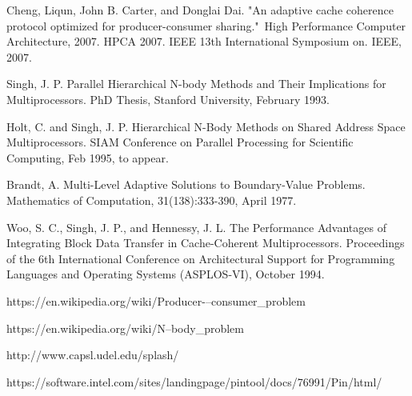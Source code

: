 \documentclass[11pt,conference]{IEEEtran}
\begin{document}
\begin{thebibliography}{1}

Cheng, Liqun, John B. Carter, and Donglai Dai. "An adaptive cache coherence protocol optimized for producer-consumer sharing." High Performance Computer Architecture, 2007. HPCA 2007. IEEE 13th International Symposium on. IEEE, 2007.

Singh, J. P.  Parallel Hierarchical N-body Methods and Their Implications for Multiprocessors.  PhD Thesis, Stanford University, February 1993.

Holt, C. and Singh, J. P.  Hierarchical N-Body Methods on Shared Address Space Multiprocessors.  SIAM Conference on Parallel Processing for Scientific Computing, Feb 1995, to appear.

Brandt, A. Multi-Level Adaptive Solutions to Boundary-Value Problems. Mathematics of Computation, 31(138):333-390, April 1977.

Woo, S. C., Singh, J. P., and Hennessy, J. L.  The Performance Advantages of Integrating Block Data Transfer in Cache-Coherent Multiprocessors. Proceedings of the 6th International Conference on Architectural Support for Programming Languages and Operating Systems (ASPLOS-VI), October 1994.

https://en.wikipedia.org/wiki/Producer-–consumer\_problem

https://en.wikipedia.org/wiki/N--body\_problem

http://www.capsl.udel.edu/splash/

https://software.intel.com/sites/landingpage/pintool/docs/76991/Pin/html/

\end{thebibliography}
\end{document}
